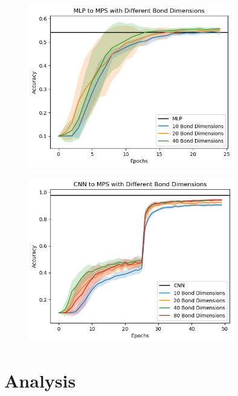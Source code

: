 \documentclass{article}
\theoremstyle{definition}
\theoremstyle{definition}
\begin{document}
\begin{figure}[H]
    \centering
    \caption{}
    \includegraphics[width=0.8\textwidth]{images/2023-04-26-11-19-35.png}
    \label{fig:MLP_to_MPS}
\end{figure}

\begin{figure}[H]
    \centering
    \caption{}
    \includegraphics[width=0.8\textwidth]{images/2023-04-26-11-19-11.png}
    \label{fig:CNN_to_MPS}
\end{figure}

\section{Analysis}
\end{document}
